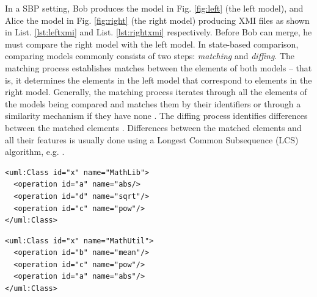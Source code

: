 \documentclass{jot}
\begin{document}
In a SBP setting, Bob produces the model in Fig. \ref{fig:left} (the left model), and Alice the model in Fig. \ref{fig:right} (the right model) producing XMI files as shown in List. \ref{lst:leftxmi} and List. \ref{lst:rightxmi} respectively.
Before Bob can merge, he must compare the right model with the left model.
In state-based comparison, comparing models commonly consists of two steps: \emph{matching} and \emph{diffing}.
The matching process establishes matches between the elements of both models -- that is, it determines the elements in the left model that correspond to elements in the right model.
Generally, the matching process iterates through all the elements of the models being compared and matches them by their identifiers or through a similarity mechanism if they have none \cite{DBLP:conf/sfm/BroschKLSWW12,emfcompare2018developer}.
The diffing process identifies differences between the matched elements \cite{DBLP:conf/sfm/BroschKLSWW12,emfcompare2018developer}.
Differences between the matched elements and all their features is usually done using a Longest Common Subsequence (LCS) algorithm, e.g. \cite{DBLP:journals/algorithmica/Meyers86}.

\vspace{-10pt}
\begin{minipage}[t]{0.49\linewidth} 
\begin{lstlisting}[style=eol,caption={The simplified XMI of the left model in Fig. \ref{fig:left}.},label=lst:leftxmi]
<uml:Class id="x" name="MathLib">
  <operation id="a" name="abs/>
  <operation id="d" name="sqrt"/>
  <operation id="c" name="pow"/>
</uml:Class>
\end{lstlisting}
\end{minipage}
\hfill
\begin{minipage}[t]{0.49\linewidth}
\begin{lstlisting}[style=eol,caption={The simplified XMI of the right model in Fig. \ref{fig:right}.},label=lst:rightxmi]
<uml:Class id="x" name="MathUtil">
  <operation id="b" name="mean"/>
  <operation id="c" name="pow"/>
  <operation id="a" name="abs"/>
</uml:Class>
\end{lstlisting}
\end{minipage}
\end{document}

